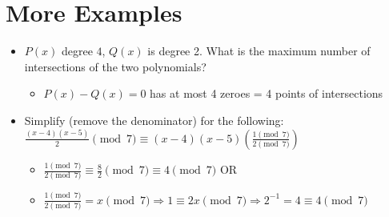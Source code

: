 \documentclass[a4paper]{article}
\begin{document}
\section{More Examples}
\begin{itemize}
    \item $P(x)$ degree $4$, $Q(x)$ is degree 2. What is the maximum number of intersections of the two polynomials?
    \begin{itemize}
        \item $P(x) - Q(x) = 0$ has at most 4 zeroes = 4 points of intersections
    \end{itemize}
    \item Simplify (remove the denominator) for the following:\\  $\frac{(x-4)(x-5)}{2} \pmod 7 \equiv (x-4)(x-5)(\frac{1\pmod 7}{2\pmod 7})$
    \begin{itemize}
        \item $\frac{1\pmod 7}{2\pmod 7} \equiv \frac{8}{2} \pmod 7 \equiv 4\pmod 7$ OR
        \item $\frac{1\pmod 7}{2\pmod 7} = x\pmod 7 \Rightarrow 1 \equiv 2x\pmod 7 \Rightarrow 2^{-1} = 4 \equiv 4\pmod 7$
    \end{itemize}
\end{itemize}
\end{document}
